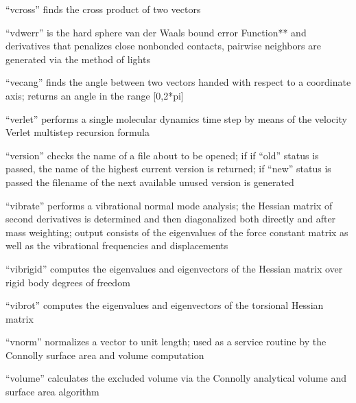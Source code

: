 \documentclass[letterpaper,11pt,english]{sphinxmanual}
\begin{document}

“vcross” finds the cross product of two vectors


“vdwerr” is the hard sphere van der Waals bound error Function** and derivatives that penalizes close nonbonded contacts, pairwise neighbors are generated via the method of lights


“vecang” finds the angle between two vectors handed with respect to a coordinate axis; returns an angle in the range {[}0,2*pi{]}


“verlet” performs a single molecular dynamics time step by means of the velocity Verlet multistep recursion formula


“version” checks the name of a file about to be opened; if if “old” status is passed, the name of the highest current version is returned; if “new” status is passed the filename of the next available unused version is generated


“vibrate” performs a vibrational normal mode analysis; the Hessian matrix of second derivatives is determined and then diagonalized both directly and after mass weighting; output consists of the eigenvalues of the force constant matrix as well as the vibrational frequencies and displacements


“vibrigid” computes the eigenvalues and eigenvectors of the Hessian matrix over rigid body degrees of freedom


“vibrot” computes the eigenvalues and eigenvectors of the torsional Hessian matrix


“vnorm” normalizes a vector to unit length; used as a service routine by the Connolly surface area and volume computation


“volume” calculates the excluded volume via the Connolly analytical volume and surface area algorithm
\end{document}
